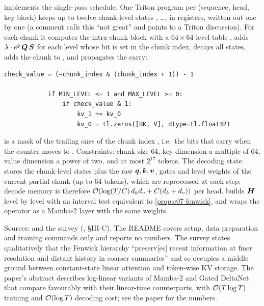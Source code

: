 \begin{implnote}[title={In the code: the \fla{} version (\texttt{fla/ops/log\_linear\_attn})}]
 implements
the single-pass schedule. One Triton program per (sequence, head, key block) keeps up to
twelve chunk-level states , \dots,  in registers, written out one by
one (a comment calls this ``not great'' and points to a Triton discussion). For each chunk it computes the
intra-chunk block with a $64\times64$ level table , adds
$\lambda\cdot e^{g}\,\bm{Q}\,\bm{S}$ for each level whose bit is set in the chunk index, decays all
states, adds the chunk to , and propagates the carry:
\begin{lstlisting}[numbers=none,caption={Excerpt from \texttt{repos/\allowbreak fla-org\_\_flash-linear-attention/\allowbreak fla/\allowbreak ops/\allowbreak log\_linear\_attn/\allowbreak chunk.py}.}]
            check_value = (~chunk_index & (chunk_index + 1)) - 1

            if MIN_LEVEL <= 1 and MAX_LEVEL >= 0:
                if check_value & 1:
                    kv_1 += kv_0
                    kv_0 = tl.zeros([BK, V], dtype=tl.float32)
\end{lstlisting}
 is a mask of the trailing ones of the chunk index , i.e.\ the
bits that carry when the counter moves to . Constraints: chunk size $64$, key
dimension a multiple of $64$, value dimension a power of two, and at most $2^{17}$ tokens.
The decoding state  stores the chunk-level states plus the
raw $\bm{q},\bm{k},\bm{v}$, gates and level weights of the current partial chunk (up to $64$ tokens),
which are reprocessed at each step; decode memory is therefore
$\mathcal{O}(\log(T/C)\,d_kd_v + C(d_k+d_v))$ per head. 
builds $\bm{H}$ level by level with an interval test equivalent to \cref{prop:c07-fenwick}, and
 wraps the operator as a Mamba-2 layer with the same
 weights.
\end{implnote}

\begin{results}
Sources:  and the survey
(, \S III-C). The README
covers setup, data preparation and training commands only and reports no numbers. The
survey states qualitatively that the Fenwick hierarchy ``preserv[es] recent information at
finer resolution and distant history in coarser summaries'' and so occupies a middle ground
between constant-state linear attention and token-wise KV storage. The paper's abstract
describes log-linear variants of Mamba-2 and Gated DeltaNet that compare favourably with their
linear-time counterparts, with $\mathcal{O}(T\log T)$ training and $\mathcal{O}(\log T)$ decoding cost;
see the paper for the numbers.
\end{results}

